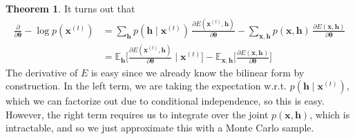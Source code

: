 \documentclass{article}
\theoremstyle{definition}
\newtheorem{theorem}{Theorem}[section]
\theoremstyle{remark}
\theoremstyle{definition}
\begin{document}
      \begin{theorem}
        It turns out that
        \begin{align*} 
        \frac{\partial}{\partial \boldsymbol{\theta}} - \log p(\mathbf{x}^{(t)}) & = \sum_{\mathbf{h}}  p(\mathbf{h} \mid \mathbf{x}^{(t)}) \, \frac{ \partial E(\mathbf{x}^{(t)}, \mathbf{h})}{\partial \boldsymbol{\theta}} - \sum_{\mathbf{x}, \mathbf{h}} p(\mathbf{x}, \mathbf{h}) \, \frac{\partial E(\mathbf{x}, \mathbf{h})}{\partial \boldsymbol{\theta}} \\
                                                                                 & = \mathbb{E}_{\mathbf{h}} \bigg[ \frac{\partial E( \mathbf{x}^{(t)}, \mathbf{h})}{\partial \boldsymbol{\theta}} \; \bigg| \; \mathbf{x}^{(t)} \bigg] - \mathbb{E}_{\mathbf{x}, \mathbf{h}} \bigg[ \frac{\partial E(\mathbf{x}, \mathbf{h})}{\partial \boldsymbol{\theta}} \bigg]  
        \end{align*}
        The derivative of $E$ is easy since we already know the bilinear form by construction. In the left term, we are taking the expectation w.r.t. $p(\mathbf{h} \mid \mathbf{x}^{(t)})$, which we can factorize out due to conditional independence, so this is easy. However, the right term requires us to integrate over the joint $p(\mathbf{x}, \mathbf{h})$, which is intractable, and so we just approximate this with a Monte Carlo sample. 
      \end{theorem}
\end{document}
